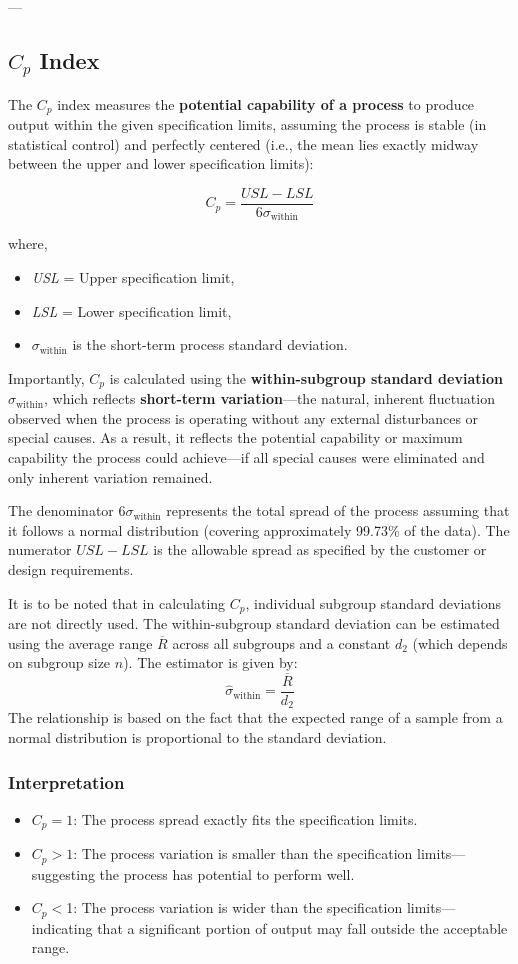 \documentclass[twoside]{book}
\begin{document}
---

\subsection{$C_p$ Index}

The $C_p$ index measures the \textbf{potential capability of a process} to produce output within the given specification limits, assuming the process is stable (in statistical control) and perfectly centered (i.e., the mean lies exactly midway between the upper and lower specification limits):
\begin{textbox}
$$C_p = \frac{USL - LSL}{6\sigma_{\text{within}}}$$
\end{textbox}
where,
\begin{itemize}
\item \textit{USL} = Upper specification limit,
\item \textit{LSL} = Lower specification limit,
\item $\sigma_{\text{within}}$ is the short-term process standard deviation.
\end{itemize}

Importantly, \(C_p\) is calculated using the \textbf{within-subgroup standard deviation} \(\sigma_{\text{within}}\), which reflects \textbf{short-term variation}—the natural, inherent fluctuation observed when the process is operating without any external disturbances or special causes. As a result, it reflects the potential capability or {maximum capability} the process could achieve—if all special causes were eliminated and only inherent variation remained.

The denominator $6\sigma_{\text{within}}$ represents the total spread of the process assuming that it follows a normal distribution (covering approximately 99.73\% of the data). The numerator $USL-LSL$ is the allowable spread as specified by the customer or design requirements.

It is to be noted that in calculating $C_p$, individual subgroup standard deviations are not directly used. The within-subgroup standard deviation can be estimated using the average range $\overline{R}$ across all subgroups and a constant $d_2$ (which depends on subgroup size $n$). The estimator is given by:
\[
\hat{\sigma}_{\text{within}} = \frac{\overline{R}}{d_2}
\]
The relationship is based on the fact that the expected range of a sample from a normal distribution is proportional to the standard deviation.

\subsubsection{Interpretation}
\begin{itemize}
\item $ C_p =1 $: The process spread exactly fits the specification limits.
\item $ C_p >1 $: The process variation is smaller than the specification limits—suggesting the process has potential to perform well.
\item $ C_p < $1: The process variation is wider than the specification limits—indicating that a significant portion of output may fall outside the acceptable range.
\end{itemize}
\end{document}
